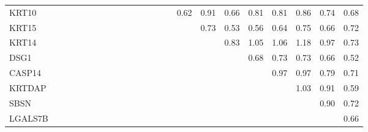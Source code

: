 \begin{longtable}{lrrrrrrrrrrrrrrrrrrrrrr}
KRT10     &            &           &            &            &              &             &            &            &            &             &           &                 &            &             &        0.62 &        0.91 &       0.66 &         0.81 &         0.81 &       0.86 &          0.74 &         0.68 \\
KRT15     &            &           &            &            &              &             &            &            &            &             &           &                 &            &             &             &        0.73 &       0.53 &         0.56 &         0.64 &       0.75 &          0.66 &         0.72 \\
KRT14     &            &           &            &            &              &             &            &            &            &             &           &                 &            &             &             &             &       0.83 &         1.05 &         1.06 &       1.18 &          0.97 &         0.73 \\
DSG1      &            &           &            &            &              &             &            &            &            &             &           &                 &            &             &             &             &            &         0.68 &         0.73 &       0.73 &          0.66 &         0.52 \\
CASP14    &            &           &            &            &              &             &            &            &            &             &           &                 &            &             &             &             &            &              &         0.97 &       0.97 &          0.79 &         0.71 \\
KRTDAP    &            &           &            &            &              &             &            &            &            &             &           &                 &            &             &             &             &            &              &              &       1.03 &          0.91 &         0.59 \\
SBSN      &            &           &            &            &              &             &            &            &            &             &           &                 &            &             &             &             &            &              &              &            &          0.90 &         0.72 \\
LGALS7B   &            &           &            &            &              &             &            &            &            &             &           &                 &            &             &             &             &            &              &              &            &               &         0.66 \\
\end{longtable}


